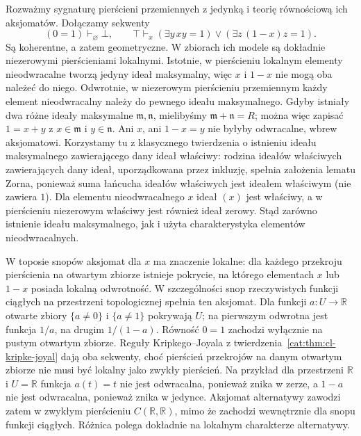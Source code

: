 \begin{przyklad}\label{cat:ex:cl-local-rings}
Rozważmy sygnaturę pierścieni przemiennych z jedynką i teorię równościową ich aksjomatów. Dołączamy sekwenty
\[
 (0=1)\vdash_{\varnothing}\bot,
 \qquad
 \top\vdash_x
 (\exists y\,xy=1)\vee(\exists z\,(1-x)z=1).
\]
Są koherentne, a zatem geometryczne. W zbiorach ich modele są dokładnie niezerowymi pierścieniami lokalnymi. Istotnie, w pierścieniu lokalnym elementy nieodwracalne tworzą jedyny ideał maksymalny, więc $x$ i $1-x$ nie mogą oba należeć do niego. Odwrotnie, w niezerowym pierścieniu przemiennym każdy element nieodwracalny należy do pewnego ideału maksymalnego. Gdyby istniały dwa różne ideały maksymalne $\mathfrak m,\mathfrak n$, mielibyśmy $\mathfrak m+\mathfrak n=R$; można więc zapisać $1=x+y$ z $x\in\mathfrak m$ i $y\in\mathfrak n$. Ani $x$, ani $1-x=y$ nie byłyby odwracalne, wbrew aksjomatowi. Korzystamy tu z klasycznego twierdzenia o istnieniu ideału maksymalnego zawierającego dany ideał właściwy: rodzina ideałów właściwych zawierających dany ideał, uporządkowana przez inkluzję, spełnia założenia lematu Zorna, ponieważ suma łańcucha ideałów właściwych jest ideałem właściwym (nie zawiera $1$). Dla elementu nieodwracalnego $x$ ideał $(x)$ jest właściwy, a w pierścieniu niezerowym właściwy jest również ideał zerowy. Stąd zarówno istnienie ideału maksymalnego, jak i użyta charakterystyka elementów nieodwracalnych.

W toposie snopów aksjomat dla $x$ ma znaczenie lokalne: dla każdego przekroju pierścienia na otwartym zbiorze istnieje pokrycie, na którego elementach $x$ lub $1-x$ posiada lokalną odwrotność. W szczególności snop rzeczywistych funkcji ciągłych na przestrzeni topologicznej spełnia ten aksjomat. Dla funkcji $a:U\to\mathbb R$ otwarte zbiory $\{a\neq0\}$ i $\{a\neq1\}$ pokrywają $U$; na pierwszym odwrotna jest funkcja $1/a$, na drugim $1/(1-a)$. Równość $0=1$ zachodzi wyłącznie na pustym otwartym zbiorze. Reguły Kripkego--Joyala z twierdzenia~\ref{cat:thm:cl-kripke-joyal} dają oba sekwenty, choć pierścień przekrojów na danym otwartym zbiorze nie musi być lokalny jako zwykły pierścień. Na przykład dla przestrzeni $\mathbb R$ i $U=\mathbb R$ funkcja $a(t)=t$ nie jest odwracalna, ponieważ znika w zerze, a $1-a$ nie jest odwracalna, ponieważ znika w jedynce. Aksjomat alternatywy zawodzi zatem w zwykłym pierścieniu $C(\mathbb R,\mathbb R)$, mimo że zachodzi wewnętrznie dla snopu funkcji ciągłych. Różnica polega dokładnie na lokalnym charakterze alternatywy.
\end{przyklad}

